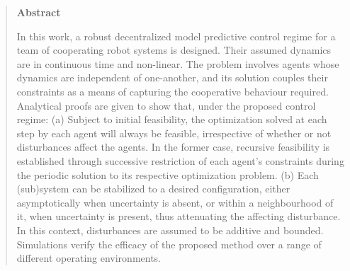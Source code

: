 

\begin{quotation}

\begin{center}
\textbf{Abstract}
\end{center}
\noindent
In this work, a robust decentralized model predictive control regime for a team
of cooperating robot systems is designed. Their assumed dynamics are
in continuous time and non-linear. The problem involves agents whose dynamics
are independent of one-another, and its solution couples their constraints as a
means of capturing the cooperative behaviour required.
Analytical proofs are given to show that, under the proposed control regime:
(a) Subject to initial feasibility, the optimization solved at each step
by each agent will always be feasible, irrespective of whether or not
disturbances affect the agents. In the former case, recursive feasibility is
established through successive restriction of each agent's constraints during
the periodic solution to its respective optimization problem.
(b) Each (sub)system can be stabilized to a desired configuration, either
asymptotically when uncertainty is absent, or within a neighbourhood of it, when
uncertainty is present, thus attenuating the affecting disturbance.
In this context, disturbances are assumed to be additive and bounded.
Simulations verify the efficacy of the proposed method over a range of different
operating environments.

\end{quotation}

\restoregeometry

